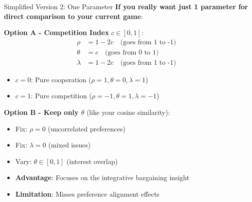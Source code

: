 \documentclass{beamer}
\begin{document}
\begin{frame}{Simplified Version 2: One Parameter}
\textbf{If you really want just 1 parameter for direct comparison to your current game}:

\vspace{0.5cm}

\textbf{Option A - Competition Index} $c \in [0,1]$:
\begin{align*}
\rho &= 1 - 2c \quad \text{(goes from 1 to -1)} \\
\theta &= c \quad \text{(goes from 0 to 1)} \\
\lambda &= 1 - 2c \quad \text{(goes from 1 to -1)}
\end{align*}

\begin{itemize}
    \item $c = 0$: Pure cooperation ($\rho=1, \theta=0, \lambda=1$)
    \item $c = 1$: Pure competition ($\rho=-1, \theta=1, \lambda=-1$)
\end{itemize}

\vspace{0.3cm}

\textbf{Option B - Keep only $\theta$} (like your cosine similarity):
\begin{itemize}
    \item Fix: $\rho = 0$ (uncorrelated preferences)
    \item Fix: $\lambda = 0$ (mixed issues)
    \item Vary: $\theta \in [0,1]$ (interest overlap)
    \item \textbf{Advantage}: Focuses on the integrative bargaining insight
    \item \textbf{Limitation}: Misses preference alignment effects
\end{itemize}
\end{frame}
\end{document}
